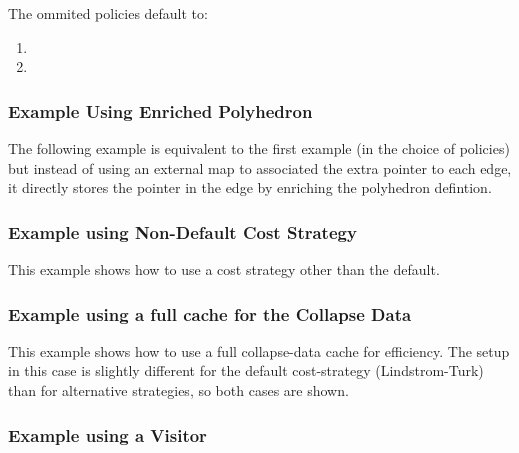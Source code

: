 The ommited policies default to:

\begin{enumerate}
\item {}
\item {}
\end{enumerate}



\subsubsection{Example Using Enriched Polyhedron}

The following example is equivalent to the first example (in the choice of policies) but instead of using an external map to associated the extra pointer to each edge, it directly stores the pointer in the edge by enriching the polyhedron defintion.



\subsubsection{Example using Non-Default Cost Strategy}

This example shows how to use a cost strategy other than the default.



\subsubsection{Example using a full cache for the Collapse Data}

This example shows how to use a full collapse-data cache for efficiency. The setup in this case is slightly different for the default cost-strategy (Lindstrom-Turk) than for alternative strategies, so both cases are shown.



\subsubsection{Example using a Visitor}

